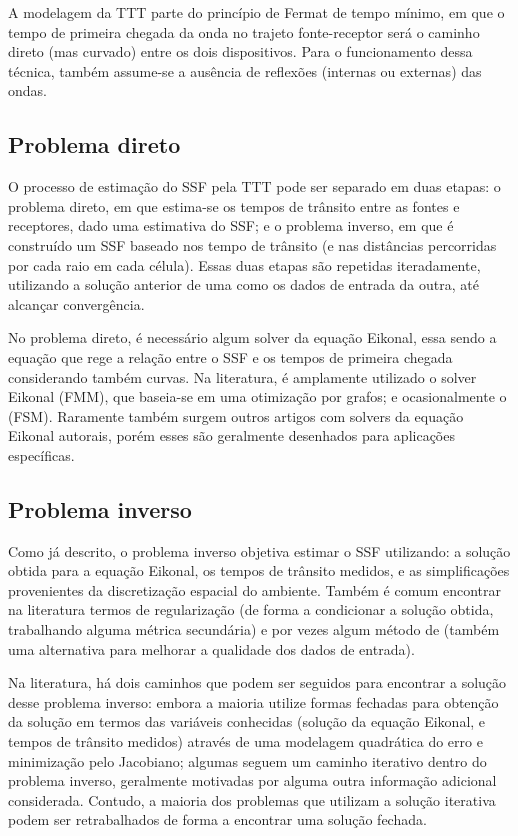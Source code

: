A modelagem da TTT parte do \gls{princípio de Fermat de tempo mínimo}, em que o tempo de primeira chegada da onda no trajeto fonte-receptor será o caminho direto (mas curvado) entre os dois dispositivos. Para o funcionamento dessa técnica, também assume-se a ausência de reflexões (internas ou externas) das ondas.

\subsection{Problema direto}

O processo de estimação do SSF pela TTT pode ser separado em duas etapas: o \gls{problema direto}, em que estima-se os tempos de trânsito entre as fontes e receptores, dado uma estimativa do SSF; e o \gls{problema inverso}, em que é construído um SSF baseado nos tempo de trânsito (e nas distâncias percorridas por cada raio em cada célula). Essas duas etapas são repetidas iteradamente, utilizando a solução anterior de uma como os dados de entrada da outra, até alcançar convergência.

No problema direto, é necessário algum solver da equação Eikonal, essa sendo a equação que rege a relação entre o SSF e os tempos de primeira chegada considerando também curvas. Na literatura, é amplamente utilizado o solver Eikonal  (FMM), que baseia-se em uma otimização por grafos; e ocasionalmente o  (FSM). Raramente também surgem outros artigos com solvers da equação Eikonal autorais, porém esses são geralmente desenhados para aplicações específicas.

\subsection{Problema inverso}

Como já descrito, o problema inverso objetiva estimar o SSF utilizando: a solução obtida para a equação Eikonal, os tempos de trânsito medidos, e as simplificações provenientes da discretização espacial do ambiente. Também é comum encontrar na literatura termos de regularização (de forma a condicionar a solução obtida, trabalhando alguma métrica secundária) e por vezes algum método de  (também uma alternativa para melhorar a qualidade dos dados de entrada).

Na literatura, há dois caminhos que podem ser seguidos para encontrar a solução desse problema inverso: embora a maioria utilize formas fechadas para obtenção da solução em termos das variáveis conhecidas (solução da equação Eikonal, e tempos de trânsito medidos) através de uma modelagem quadrática do erro e minimização pelo Jacobiano; algumas seguem um caminho iterativo dentro do problema inverso, geralmente motivadas por alguma outra informação adicional considerada. Contudo, a maioria dos problemas que utilizam a solução iterativa podem ser retrabalhados de forma a encontrar uma solução fechada.

